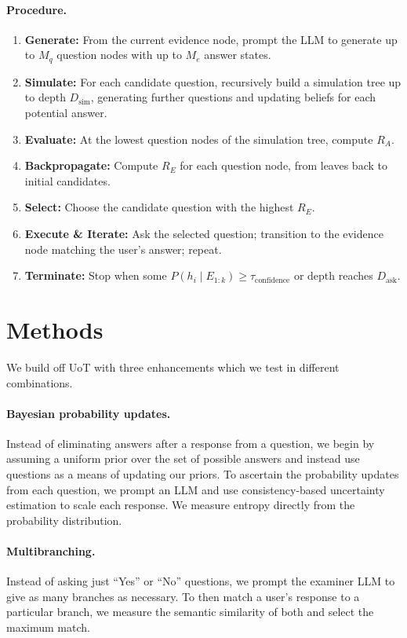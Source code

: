 \documentclass{article} %
\begin{document}
\paragraph{Procedure.}
\begin{enumerate}
  \item \textbf{Generate:} From the current evidence node, prompt the LLM to generate up to $M_q$ question nodes with up to $M_e$ answer states.
  \item \textbf{Simulate:} For each candidate question, recursively build a simulation tree up to depth $D_{\text{sim}}$, generating further questions and updating beliefs for each potential answer.
  \item \textbf{Evaluate:} At the lowest question nodes of the simulation tree, compute $R_A$.
  \item \textbf{Backpropagate:} Compute $R_E$ for each question node, from leaves back to initial candidates.
  \item \textbf{Select:} Choose the candidate question with the highest $R_E$.
  \item \textbf{Execute \& Iterate:} Ask the selected question; transition to the evidence node matching the user’s answer; repeat.
  \item \textbf{Terminate:} Stop when some $P(h_i\mid E_{1:k}) \ge \tau_{\text{confidence}}$ or depth reaches $D_{\text{ask}}$.
\end{enumerate}

\section{Methods}

We build off UoT with three enhancements which we test in different combinations.

\paragraph{Bayesian probability updates.}
Instead of eliminating answers after a response from a question, we begin by assuming a uniform prior over the set of possible answers and instead use questions as a means of updating our priors. To ascertain the probability updates from each question, we prompt an LLM and use consistency-based uncertainty estimation to scale each response. We measure entropy directly from the probability distribution.

\paragraph{Multibranching.}
Instead of asking just ``Yes'' or ``No'' questions, we prompt the examiner LLM to give as many branches as necessary. To then match a user’s response to a particular branch, we measure the semantic similarity of both and select the maximum match.
\end{document}

